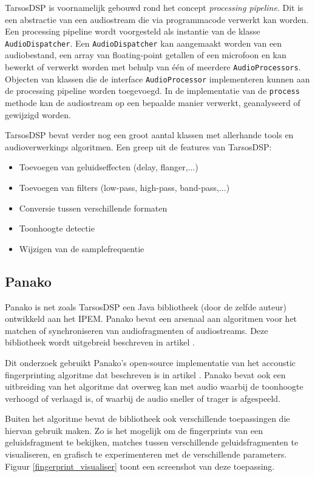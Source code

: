 TarsosDSP is voornamelijk gebouwd rond het concept \textit{processing pipeline}. Dit is een abstractie van een audiostream die via programmacode verwerkt kan worden. Een processing pipeline wordt voorgesteld als instantie van de klasse \texttt{AudioDispatcher}. Een \texttt{AudioDispatcher} kan aangemaakt worden van een audiobestand, een array van floating-point getallen of een microfoon en kan bewerkt of verwerkt worden met behulp van één of meerdere \texttt{AudioProcessors}. Objecten van klassen die de interface \texttt{AudioProcessor} implementeren kunnen aan de processing pipeline worden toegevoegd. In de implementatie van de \texttt{process} methode kan de audiostream op een bepaalde manier verwerkt, geanalyseerd of gewijzigd worden.

TarsosDSP bevat verder nog een groot aantal klassen met allerhande tools en audioverwerkings algoritmen. Een greep uit de features van TarsosDSP:
\begin{itemize}[noitemsep]
	\item Toevoegen van geluidseffecten (delay, flanger,...)
	\item Toevoegen van filters (low-pass, high-pass, band-pass,...)
	\item Conversie tussen verschillende formaten
	\item Toonhoogte detectie
	\item Wijzigen van de samplefrequentie
\end{itemize}

\subsection{Panako}

Panako is net zoals TarsosDSP een Java bibliotheek (door de zelfde auteur) ontwikkeld aan het IPEM. Panako bevat een arsenaal aan algoritmen voor het matchen of synchroniseren van audiofragmenten of audiostreams.  Deze bibliotheek wordt uitgebreid beschreven in artikel \cite{six2014panako}.

Dit onderzoek gebruikt Panako's open-source implementatie van het accoustic fingerprinting algoritme dat beschreven is in artikel \cite{Wang2003a}. Panako bevat ook een uitbreiding van het algoritme dat overweg kan met audio waarbij de toonhoogte verhoogd of verlaagd is, of waarbij de audio sneller of trager is afgespeeld.

Buiten het algoritme bevat de bibliotheek ook verschillende toepassingen die hiervan gebruik maken. Zo is het mogelijk om de fingerprints van een geluidsfragment te bekijken, matches tussen verschillende geluidsfragmenten te visualiseren, en grafisch te experimenteren met de verschillende parameters. Figuur \ref{fingerprint_visualiser} toont een screenshot van deze toepassing.


